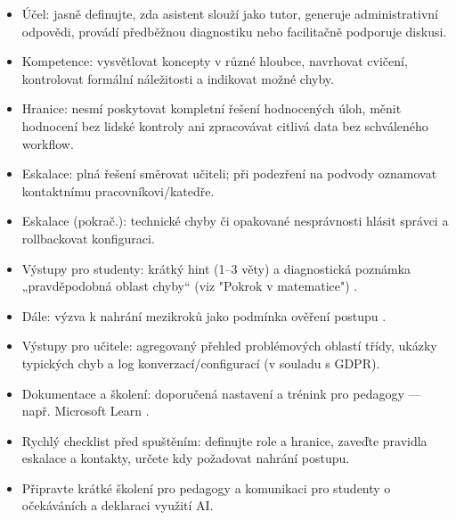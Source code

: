 \begin{itemize}
\item Účel: jasně definujte, zda asistent slouží jako tutor, generuje administrativní odpovědi, provádí předběžnou diagnostiku nebo facilitačně podporuje diskusi.
\item Kompetence: vysvětlovat koncepty v různé hloubce, navrhovat cvičení, kontrolovat formální náležitosti a indikovat možné chyby.
\item Hranice: nesmí poskytovat kompletní řešení hodnocených úloh, měnit hodnocení bez lidské kontroly ani zpracovávat citlivá data bez schváleného workflow.
\item Eskalace: plná řešení směrovat učiteli; při podezření na podvody oznamovat kontaktnímu pracovníkovi/katedře.
\item Eskalace (pokrač.): technické chyby či opakované nesprávnosti hlásit správci a rollbackovat konfiguraci.
\item Výstupy pro studenty: krátký hint (1–3 věty) a diagnostická poznámka „pravděpodobná oblast chyby“ (viz "Pokrok v matematice") \cite{kb_ai_101_tipu_pdf_04e4a115_page_8_1}.
\item Dále: výzva k nahrání mezikroků jako podmínka ověření postupu \cite{kb_ai_101_tipu_pdf_04e4a115_page_8_1}.
\item Výstupy pro učitele: agregovaný přehled problémových oblastí třídy, ukázky typických chyb a log konverzací/configurací (v souladu s GDPR).
\item Dokumentace a školení: doporučená nastavení a trénink pro pedagogy — např. Microsoft Learn \cite{kb_ai_101_tipu_pdf_04e4a115_page_54_1}.
\item Rychlý checklist před spuštěním: definujte role a hranice, zaveďte pravidla eskalace a kontakty, určete kdy požadovat nahrání postupu.
\item Připravte krátké školení pro pedagogy a komunikaci pro studenty o očekáváních a deklaraci využití AI.
\end{itemize}